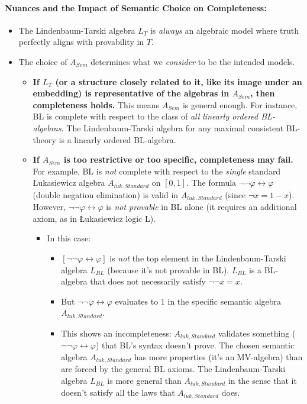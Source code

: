\paragraph{Nuances and the Impact of Semantic Choice on Completeness:}

\begin{itemize}
\item The Lindenbaum-Tarski algebra $L_T$ is \emph{always} an algebraic model where truth perfectly aligns with provability in $T$.
\item The choice of $A_{Sem}$ determines what we \emph{consider} to be the intended models.
\begin{itemize}
\item \textbf{If $L_T$ (or a structure closely related to it, like its image under an embedding) is representative of the algebras in $A_{Sem}$, then completeness holds.} This means $A_{Sem}$ is general enough. For instance, BL is complete with respect to the class of \emph{all linearly ordered BL-algebras}. The Lindenbaum-Tarski algebra for any maximal consistent BL-theory is a linearly ordered BL-algebra.
\item \textbf{If $A_{Sem}$ is too restrictive or too specific, completeness may fail.} For example, BL is \emph{not} complete with respect to the \emph{single} standard Łukasiewicz algebra $A_{luk, Standard}$ on $[0,1]$. The formula $\neg \neg \varphi \leftrightarrow \varphi$ (double negation elimination) is valid in $A_{luk, Standard}$ (since $\neg x = 1 - x$). However, $\neg \neg \varphi \leftrightarrow \varphi$ is \emph{not provable} in BL alone (it requires an additional axiom, as in Łukasiewicz logic L).
\begin{itemize}
\item In this case:
\begin{itemize}
\item $[\neg \neg \varphi \leftrightarrow \varphi]$ is \emph{not} the top element in the Lindenbaum-Tarski algebra $L_{BL}$ (because it's not provable in BL). $L_{BL}$ is a BL-algebra that does not necessarily satisfy $\neg \neg x = x$.
\item But $\neg \neg \varphi \leftrightarrow \varphi$ evaluates to $1$ in the specific semantic algebra $A_{luk, Standard}$.
\item This shows an incompleteness: $A_{luk, Standard}$ validates something ($\neg \neg \varphi \leftrightarrow \varphi$) that BL's syntax doesn't prove. The chosen semantic algebra $A_{luk, Standard}$ has more properties (it's an MV-algebra) than are forced by the general BL axioms. The Lindenbaum-Tarski algebra $L_{BL}$ is more general than $A_{luk, Standard}$ in the sense that it doesn't satisfy all the laws that $A_{luk, Standard}$ does.
\end{itemize}
\end{itemize}
\end{itemize}
\end{itemize}



